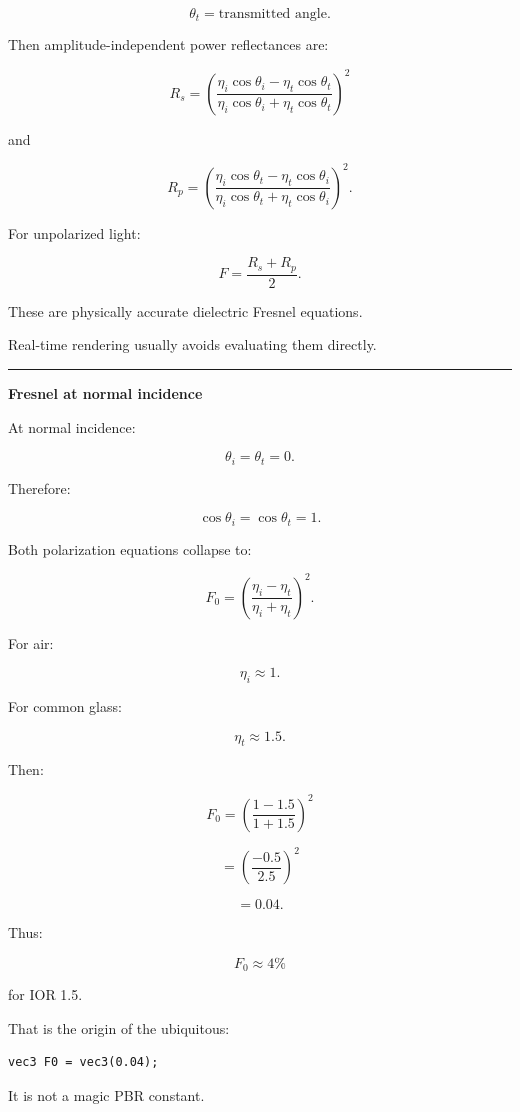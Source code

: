 \[
\theta_t=\text{transmitted angle}.
\]

Then amplitude-independent power reflectances are:

\[
\boxed{
R_s=
\left(
\frac{
\eta_i\cos\theta_i-\eta_t\cos\theta_t
}{
\eta_i\cos\theta_i+\eta_t\cos\theta_t
}
\right)^2
}
\]

and

\[
\boxed{
R_p=
\left(
\frac{
\eta_i\cos\theta_t-\eta_t\cos\theta_i
}{
\eta_i\cos\theta_t+\eta_t\cos\theta_i
}
\right)^2.
}
\]

For unpolarized light:

\[
\boxed{
F=
\frac{R_s+R_p}{2}.
}
\]

These are physically accurate dielectric Fresnel equations.

Real-time rendering usually avoids evaluating them directly.

\begin{center}\rule{0.5\linewidth}{0.5pt}\end{center}

\textbf{Fresnel at normal incidence}

At normal incidence:

\[
\theta_i=\theta_t=0.
\]

Therefore:

\[
\cos\theta_i=\cos\theta_t=1.
\]

Both polarization equations collapse to:

\[
\boxed{
F_0=
\left(
\frac{\eta_i-\eta_t}
{\eta_i+\eta_t}
\right)^2.
}
\]

For air:

\[
\eta_i\approx1.
\]

For common glass:

\[
\eta_t\approx1.5.
\]

Then:

\[
F_0=
\left(
\frac{1-1.5}
{1+1.5}
\right)^2
\]

\[
=
\left(
\frac{-0.5}{2.5}
\right)^2
\]

\[
=
0.04.
\]

Thus:

\[
\boxed{F_0\approx4\%}
\]

for IOR 1.5.

That is the origin of the ubiquitous:

\begin{verbatim}
vec3 F0 = vec3(0.04);
\end{verbatim}

It is not a magic PBR constant.

